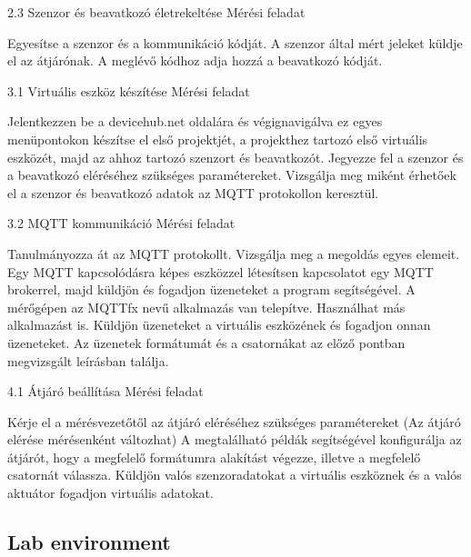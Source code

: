 \documentclass[a4paper]{article}
\begin{document}
2.3 Szenzor és beavatkozó életrekeltése
Mérési feladat

Egyesítse a szenzor és a kommunikáció kódját. A szenzor által mért jeleket küldje el az átjárónak.
A meglévő kódhoz adja hozzá a beavatkozó kódját.

3.1 Virtuális eszköz készítése
Mérési feladat

Jelentkezzen be a devicehub.net oldalára és végignavigálva ez egyes menüpontokon készítse el első projektjét, a
projekthez tartozó első virtuális eszközét, majd az ahhoz tartozó szenzort és beavatkozót.
Jegyezze fel a szenzor és a beavatkozó eléréséhez szükséges paramétereket.
Vizsgálja meg miként érhetőek el a szenzor és beavatkozó adatok az MQTT protokollon keresztül.

3.2 MQTT kommunikáció
Mérési feladat

Tanulmányozza át az MQTT protokollt. Vizsgálja meg a megoldás egyes elemeit.
Egy MQTT kapcsolódásra képes eszközzel létesítsen kapcsolatot egy MQTT brokerrel, majd küldjön és fogadjon
üzeneteket a program segítségével. A mérőgépen az MQTTfx nevű alkalmazás van telepítve. Használhat más alkalmazást is.
Küldjön üzeneteket a virtuális eszközének és fogadjon onnan üzeneteket. Az üzenetek formátumát és a csatornákat az
előző pontban megvizsgált leírásban találja.

4.1 Átjáró beállítása
Mérési feladat

Kérje el a mérésvezetőtől az átjáró eléréséhez szükséges paramétereket (Az átjáró elérése mérésenként változhat)
A megtalálható példák segítségével konfigurálja az átjárót, hogy a megfelelő formátumra alakítást végezze, illetve
a megfelelő csatornát válassza.
Küldjön valós szenzoradatokat a virtuális eszköznek és a valós aktuátor fogadjon virtuális adatokat.

\subsection{Lab environment}
\end{document}
